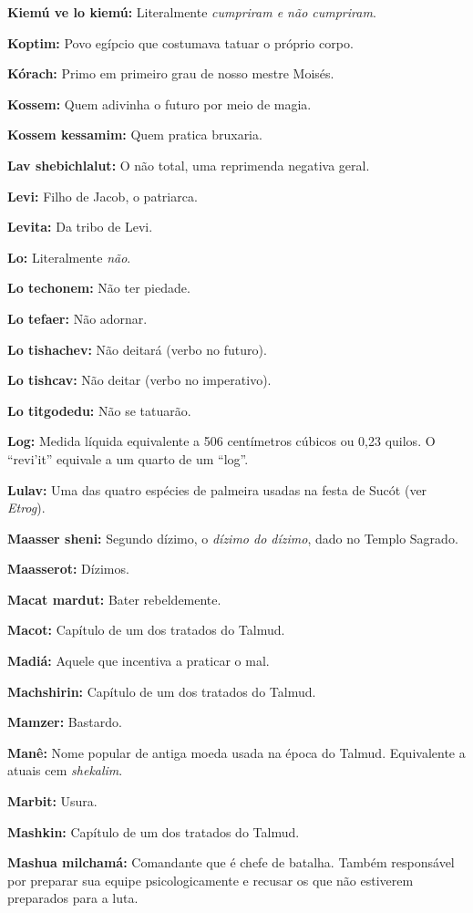 \begin{hangparas}{.25in}{1}
{\textbf{Kiemú ve lo kiemú:} Literalmente \emph{cumpriram e não cumpriram}.

\textbf{Koptim:} Povo egípcio que costumava tatuar o próprio corpo.

\textbf{Kórach:} Primo em primeiro grau de nosso mestre Moisés.

\textbf{Kossem:} Quem adivinha o futuro por meio de magia.

\textbf{Kossem kessamim:} Quem pratica bruxaria.

\textbf{Lav shebichlalut:} O não total, uma reprimenda negativa geral.

\textbf{Levi:} Filho de Jacob, o patriarca.

\textbf{Levita:} Da tribo de Levi.

\textbf{Lo:} Literalmente \emph{não}.

\textbf{Lo techonem:} Não ter piedade.

\textbf{Lo tefaer:} Não adornar.

\textbf{Lo tishachev:} Não deitará (verbo no futuro).

\textbf{Lo tishcav:} Não deitar (verbo no imperativo).

\textbf{Lo titgodedu:} Não se tatuarão.

\textbf{Log:} Medida líquida equivalente a 506 centímetros cúbicos ou 0,23 quilos. O ``revi'it'' equivale a um quarto de um ``log''.

\textbf{Lulav:} Uma das quatro espécies de palmeira usadas na festa de
Sucót (ver \emph{Etrog}).

\textbf{Maasser sheni:} Segundo dízimo, o \emph{dízimo do dízimo}, dado no
Templo Sagrado.

\textbf{Maasserot:} Dízimos.

\textbf{Macat mardut:} Bater rebeldemente.

\textbf{Macot:} Capítulo de um dos tratados do Talmud.

\textbf{Madiá:} Aquele que incentiva a praticar o mal.

\textbf{Machshirin:} Capítulo de um dos tratados do Talmud.

\textbf{Mamzer:} Bastardo.

\textbf{Manê:} Nome popular de antiga moeda usada na época do Talmud. Equivalente a atuais cem \emph{shekalim}.

\textbf{Marbit:} Usura.

\textbf{Mashkin:} Capítulo de um dos tratados do Talmud.

\textbf{Mashua milchamá:} Comandante que é chefe de
batalha. Também responsável por preparar sua equipe
psicologicamente e recusar os que não estiverem preparados para a
luta.

}
\end{hangparas}
